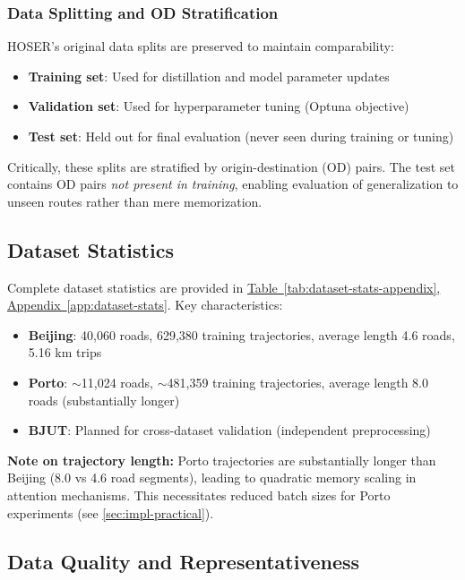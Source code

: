 \subsubsection{Data Splitting and OD Stratification}

HOSER's original data splits are preserved to maintain comparability:

\begin{itemize}[noitemsep,topsep=0pt]
\item \textbf{Training set}: Used for distillation and model parameter updates
\item \textbf{Validation set}: Used for hyperparameter tuning (Optuna objective)
\item \textbf{Test set}: Held out for final evaluation (never seen during training or tuning)
\end{itemize}

Critically, these splits are stratified by origin-destination (OD) pairs. The test set contains OD pairs \emph{not present in training}, enabling evaluation of generalization to unseen routes rather than mere memorization.

\subsection{Dataset Statistics}
\label{sec:data-stats}

Complete dataset statistics are provided in \hyperref[app:dataset-stats]{Table~\ref*{tab:dataset-stats-appendix}, Appendix~\ref*{app:dataset-stats}}. Key characteristics:

\begin{itemize}[noitemsep,topsep=0pt]
\item \textbf{Beijing}: 40,060 roads, 629,380 training trajectories, average length 4.6 roads, 5.16 km trips
\item \textbf{Porto}: $\sim$11,024 roads, $\sim$481,359 training trajectories, average length 8.0 roads (substantially longer)
\item \textbf{BJUT}: Planned for cross-dataset validation (independent preprocessing)
\end{itemize}

\textbf{Note on trajectory length:} Porto trajectories are substantially longer than Beijing (8.0 vs 4.6 road segments), leading to quadratic memory scaling in attention mechanisms. This necessitates reduced batch sizes for Porto experiments (see \autoref{sec:impl-practical}).

\subsection{Data Quality and Representativeness}
\label{sec:data-quality}

